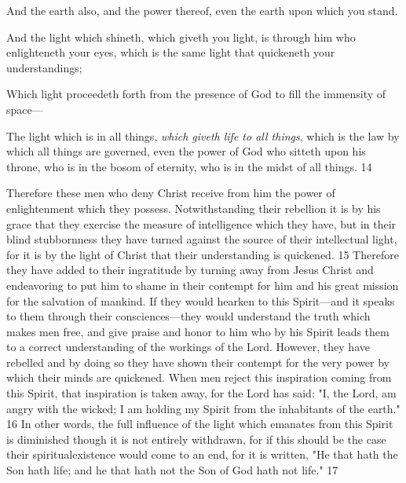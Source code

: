 And the earth also, and the power thereof, even the earth upon which you stand.

And the light which shineth, which giveth you light, is through him who enlighteneth your
eyes, which is the same light that quickeneth your understandings;

Which light proceedeth forth from the presence of God to fill the immensity of space—

The light which is in all things, \textit{which giveth life to all things}, which is the law by which all
things are governed, even the power of God who sitteth upon his throne, who is in the bosom
of eternity, who is in the midst of all things. 14

Therefore these men who deny Christ receive from him the power of enlightenment which
they possess. Notwithstanding their rebellion it is by his grace that they exercise the measure
of intelligence which they have, but in their blind stubbornness they have turned against the
source of their intellectual light, for it is by the light of Christ that their understanding is
quickened. 15 Therefore they have added to their ingratitude by turning away from Jesus
Christ and endeavoring to put him to shame in their contempt for him and his great mission
for the salvation of mankind. If they would hearken to this Spirit—and it speaks to them
through their consciences—they would understand the truth which makes men free, and give
praise and honor to him who by his Spirit leads them to a correct understanding of the
workings of the Lord. However, they have rebelled and by doing so they have shown their
contempt for the very power by which their minds are quickened. When men reject this
inspiration coming from this Spirit, that inspiration is taken away, for the Lord has said: "I,
the Lord, am angry with the wicked; I am holding my Spirit from the inhabitants of the
earth." 16 In other words, the full influence of the light which emanates from this Spirit is
diminished though it is not entirely withdrawn, for if this should be the case their spiritualexistence would come to an end, for it is written, "He that hath the Son hath life; and he that
hath not the Son of God hath not life." 17


